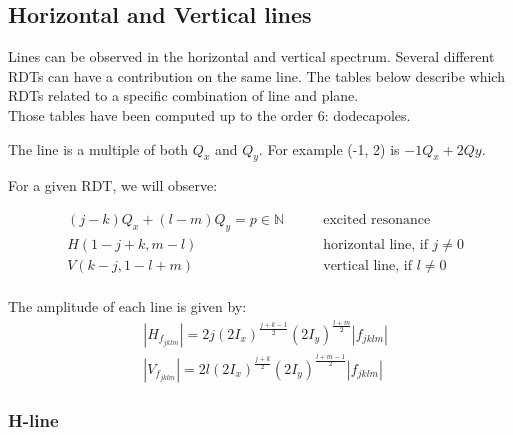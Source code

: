 \documentclass[12pt,a4,]{article}
\numberwithin{equation}{subsection}
\begin{document}
\newpage

\hypertarget{horizontal-and-vertical-lines}{%
\subsection{Horizontal and Vertical lines}\label{horizontal-and-vertical-lines}}

Lines can be observed in the horizontal and vertical spectrum. Several
different RDTs can have a contribution on the same line. The tables
below describe which RDTs related to a specific combination of line and
plane.\\
Those tables have been computed up to the order 6: dodecapoles.

The line is a multiple of both \(Q_x\) and \(Q_y\). For example (-1, 2)
is \(-1Q_x + 2Qy\).

For a given RDT, we will observe:

\begin{equation}\begin{aligned}
& (j-k)Q_x + (l-m)Q_y = p \in \mathbb{N} \quad\quad& \mbox{excited resonance}\\
& H(1 - j + k, m - l) \quad\quad& \mbox{horizontal line, if } j \ne 0 \\
& V(k - j, 1 - l + m) \quad\quad& \mbox{vertical line, if } l \ne 0 \\
\end{aligned}\end{equation}

The amplitude of each line is given by:
\begin{equation}
    \begin{aligned}
    &|H_{f_{jklm}}| = 2 j (2 I_x)^\frac{j+k-1}{2} (2 I_y)^\frac{l+m}{2} |f_{jklm}| \\
    &|V_{f_{jklm}}| = 2 l (2 I_x)^\frac{j+k}{2} (2 I_y)^\frac{l+m-1}{2} |f_{jklm}|
    \label{eq:amplitude_fjklm}
    \end{aligned}
\end{equation}

\hypertarget{h-line}{%
\subsubsection{H-line}\label{h-line}}
\end{document}
